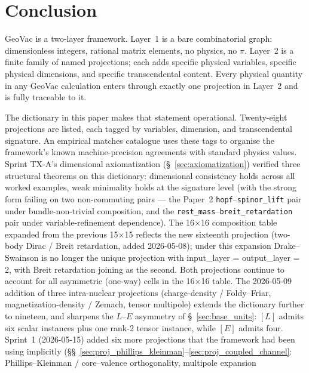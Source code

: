 \documentclass[11pt]{article}
\begin{document}
\section{Conclusion}
\label{sec:conclusion}

GeoVac is a two-layer framework.  Layer~1 is a bare combinatorial
graph: dimensionless integers, rational matrix elements, no
physics, no $\pi$.  Layer~2 is a finite family of named projections;
each adds specific physical variables, specific physical
dimensions, and specific transcendental content.  Every physical
quantity in any GeoVac calculation enters through exactly one
projection in Layer~2 and is fully traceable to it.

The dictionary in this paper makes that statement operational.
Twenty-eight projections are listed, each tagged by variables, dimension,
and transcendental signature.  An empirical matches catalogue uses
these tags to organise the framework's known machine-precision
agreements with standard physics values.  Sprint TX-A's
dimensional axiomatization (\S~\ref{sec:axiomatization}) verified
three structural theorems on this dictionary: dimensional consistency
holds across all worked examples, weak minimality holds at the
signature level (with the strong form failing on two non-commuting
pairs --- the Paper~2 \texttt{hopf}--\texttt{spinor\_lift} pair under
bundle-non-trivial composition, and the
\texttt{rest\_mass}--\texttt{breit\_retardation} pair under
variable-refinement dependence).  The 16$\times$16 composition table
expanded from the previous 15$\times$15 reflects the new sixteenth
projection (two-body Dirac / Breit retardation, added 2026-05-08);
under this expansion Drake--Swainson is no longer the unique
projection with input\_layer = output\_layer = 2, with Breit
retardation joining as the second.  Both projections continue to
account for all asymmetric (one-way) cells in the 16$\times$16
table.  The 2026-05-09 addition of three intra-nuclear projections
(charge-density / Foldy--Friar, magnetization-density / Zemach,
tensor multipole) extends the dictionary further to nineteen, and
sharpens the $L$--$E$ asymmetry of \S~\ref{sec:base_units}: $[L]$
admits six scalar instances plus one rank-2 tensor instance, while
$[E]$ admits four.  Sprint~1 (2026-05-15) added six more
projections that the framework had been using implicitly
(\S\S~\ref{sec:proj_phillips_kleinman}--\ref{sec:proj_coupled_channel}:
Phillips--Kleinman / core--valence orthogonality, multipole expansion
\end{document}
